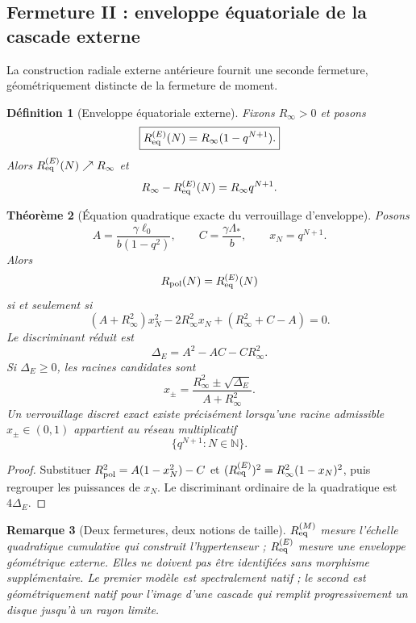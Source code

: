 \documentclass[11pt,a4paper]{article}
\newtheorem{theorem}{Théorème}[section]
\newtheorem{definition}[theorem]{Définition}
\newtheorem{remark}[theorem]{Remarque}
\begin{document}
\subsection{Fermeture II : enveloppe équatoriale de la cascade externe}

La construction radiale externe antérieure fournit une seconde fermeture, géométriquement distincte de la fermeture de moment.

\begin{definition}[Enveloppe équatoriale externe]\label{def:v8-envelope-equator}
Fixons $R_\infty>0$ et posons
\begin{equation}\label{eq:v8-Req-envelope}
 \boxed{
 R_{\rm eq}^{(E)}(N)=R_\infty(1-q^{N+1}).}
\end{equation}
Alors $R_{\rm eq}^{(E)}(N)\nearrow R_\infty$ et
\[
 R_\infty-R_{\rm eq}^{(E)}(N)=R_\infty q^{N+1}.
\]
\end{definition}

\begin{theorem}[Équation quadratique exacte du verrouillage d'enveloppe]\label{thm:v8-envelope-lock}
Posons
\[
 A=\frac{\gamma\ell_0}{b(1-q^2)},
 \qquad
 C=\frac{\gamma\Lambda_*}{b},
 \qquad
 x_N=q^{N+1}.
\]
Alors
\[
 R_{\rm pol}(N)=R_{\rm eq}^{(E)}(N)
\]
si et seulement si
\begin{equation}\label{eq:v8-envelope-quadratic}
 \boxed{
 (A+R_\infty^2)x_N^2
 -2R_\infty^2x_N
 +(R_\infty^2+C-A)=0.}
\end{equation}
Le discriminant réduit est
\begin{equation}\label{eq:v8-envelope-radicand}
 \Delta_E=A^2-AC-CR_\infty^2.
\end{equation}
Si $\Delta_E\ge0$, les racines candidates sont
\begin{equation}\label{eq:v8-envelope-roots}
 x_\pm=
 \frac{R_\infty^2\pm\sqrt{\Delta_E}}
 {A+R_\infty^2}.
\end{equation}
Un verrouillage discret exact existe précisément lorsqu'une racine admissible $x_\pm\in(0,1)$ appartient au réseau multiplicatif
\[
 \{q^{N+1}:N\in\mathbb N\}.
\]
\end{theorem}

\begin{proof}
Substituer
$R_{\rm pol}^2=A(1-x_N^2)-C$
et
$(R_{\rm eq}^{(E)})^2=R_\infty^2(1-x_N)^2$,
puis regrouper les puissances de $x_N$. Le discriminant ordinaire de la quadratique est $4\Delta_E$.
\end{proof}

\begin{remark}[Deux fermetures, deux notions de taille]
$R_{\rm eq}^{(M)}$ mesure l'échelle quadratique cumulative qui construit l'hypertenseur ; $R_{\rm eq}^{(E)}$ mesure une enveloppe géométrique externe. Elles ne doivent pas être identifiées sans morphisme supplémentaire. Le premier modèle est spectralement natif ; le second est géométriquement natif pour l'image d'une cascade qui remplit progressivement un disque jusqu'à un rayon limite.
\end{remark}
\end{document}
